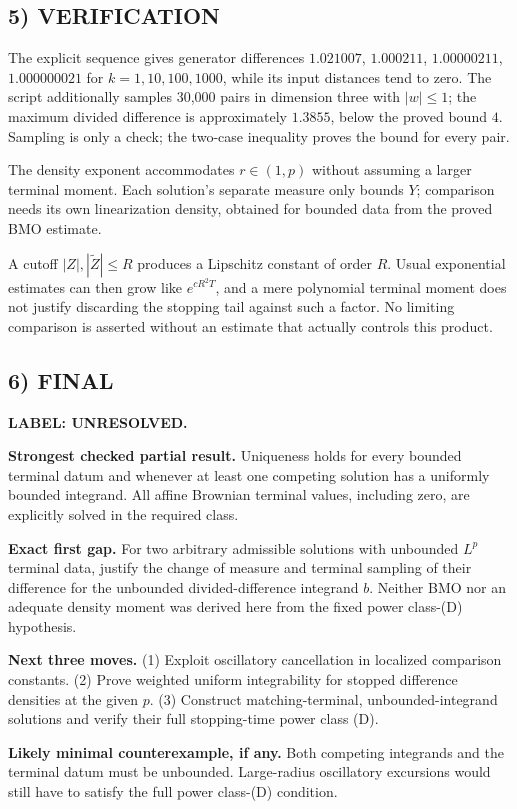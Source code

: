 \documentclass[11pt,a4paper]{article}
\theoremstyle{definition}
\newcommand{\unresolved}{\textbf{LABEL: UNRESOLVED.}}
\begin{document}
\subsection*{5) VERIFICATION}
The explicit sequence gives generator differences $1.021007$, $1.000211$, $1.00000211$, $1.000000021$ for $k=1,10,100,1000$, while its input distances tend to zero. The script additionally samples 30,000 pairs in dimension three with $|w|\le1$; the maximum divided difference is approximately $1.3855$, below the proved bound $4$. Sampling is only a check; the two-case inequality proves the bound for every pair.

The density exponent accommodates $r\in(1,p)$ without assuming a larger terminal moment. Each solution's separate measure only bounds $Y$; comparison needs its own linearization density, obtained for bounded data from the proved BMO estimate.

A cutoff $|Z|,|\widetilde Z|\le R$ produces a Lipschitz constant of order $R$. Usual exponential estimates can then grow like $e^{cR^2T}$, and a mere polynomial terminal moment does not justify discarding the stopping tail against such a factor. No limiting comparison is asserted without an estimate that actually controls this product.

\subsection*{6) FINAL}
\unresolved

\textbf{Strongest checked partial result.} Uniqueness holds for every bounded terminal datum and whenever at least one competing solution has a uniformly bounded integrand. All affine Brownian terminal values, including zero, are explicitly solved in the required class.

\textbf{Exact first gap.} For two arbitrary admissible solutions with unbounded $L^p$ terminal data, justify the change of measure and terminal sampling of their difference for the unbounded divided-difference integrand $b$. Neither BMO nor an adequate density moment was derived here from the fixed power class-(D) hypothesis.

\textbf{Next three moves.} (1) Exploit oscillatory cancellation in localized comparison constants. (2) Prove weighted uniform integrability for stopped difference densities at the given $p$. (3) Construct matching-terminal, unbounded-integrand solutions and verify their full stopping-time power class (D).

\textbf{Likely minimal counterexample, if any.} Both competing integrands and the terminal datum must be unbounded. Large-radius oscillatory excursions would still have to satisfy the full power class-(D) condition.
\end{document}
